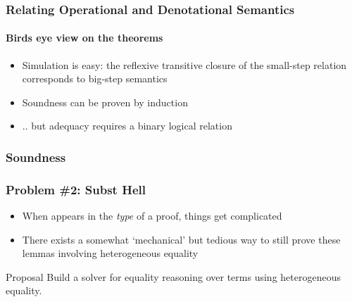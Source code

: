 \documentclass[dvipsnames,aspectratio=169,pdftex]{beamer}
\begin{document}
\begin{frame}[fragile]
  \frametitle{Relating Operational and Denotational Semantics}
  \framesubtitle{Birds eye view on the theorems}
    \vspace{5mm}
    \begin{itemize}
      \item Simulation is easy: the reflexive transitive closure of the small-step relation corresponds to big-step semantics
      \item Soundness can be proven by induction
      \item .. but adequacy requires a binary logical relation 
    \end{itemize}
\end{frame}

\begin{frame}[fragile]
  \frametitle{Soundness}
  \BigStepSoundnessType
  \SmallStepSoundness
  \vspace{-12.5mm} 
  \SmallStepSoundnessProofExcerpt
\end{frame}

\begin{frame}[fragile]
  \frametitle{Problem \#2: Subst Hell}
  \SubstExamplesDef
  \vspace{-7.5mm} 
  \SubstExamplesFusionESubESub
  \vspace{-7.5mm} 
  \begin{itemize}
    \item When  appears in the \emph{type} of a proof, things get complicated
    \item There exists a somewhat `mechanical' but tedious way to still prove these lemmas involving heterogeneous equality
  \end{itemize}
  \begin{exampleblock}{Proposal}
    Build a solver for equality reasoning over  terms using heterogeneous equality. 
  \end{exampleblock}
\end{frame}
\end{document}
